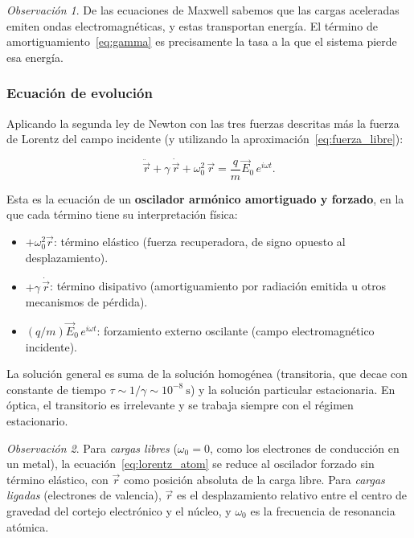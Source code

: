 \documentclass[12pt, a4paper]{article}
\theoremstyle{plain}
\theoremstyle{definition}
\theoremstyle{remark}
\newtheorem*{observacion}{Observación}
\newcommand{\ve}[1]{\vec{#1}}
\begin{document}
\begin{observacion}
De las ecuaciones de Maxwell sabemos que las cargas aceleradas emiten
ondas electromagnéticas, y estas transportan energía. El término de
amortiguamiento~\eqref{eq:gamma} es precisamente la tasa a la que el
sistema pierde esa energía.
\end{observacion}

\subsubsection{Ecuación de evolución}

Aplicando la segunda ley de Newton con las tres fuerzas descritas más la
fuerza de Lorentz del campo incidente (y utilizando la
aproximación~\eqref{eq:fuerza_libre}):

\begin{mdframed}[style=resultado]
\begin{equation}
  \ddot{\ve{r}} + \gamma\,\dot{\ve{r}} + \omega_0^2\,\ve{r}
  = \frac{q}{m}\ve{E}_0\,e^{i\omega t}.
  \label{eq:lorentz_atom}
\end{equation}
\end{mdframed}

Esta es la ecuación de un \textbf{oscilador armónico amortiguado y forzado},
en la que cada término tiene su interpretación física:
\begin{itemize}
  \item $+\omega_0^2\ve{r}$: término elástico (fuerza recuperadora, de signo
        opuesto al desplazamiento).
  \item $+\gamma\,\dot{\ve{r}}$: término disipativo (amortiguamiento por
        radiación emitida u otros mecanismos de pérdida).
  \item $(q/m)\ve{E}_0\,e^{i\omega t}$: forzamiento externo oscilante (campo
        electromagnético incidente).
\end{itemize}
La solución general es suma de la solución homogénea (transitoria, que decae
con constante de tiempo $\tau \sim 1/\gamma \sim 10^{-8}\ \mathrm{s}$) y la
solución particular estacionaria. En óptica, el transitorio es irrelevante y
se trabaja siempre con el régimen estacionario.

\begin{observacion}
Para \emph{cargas libres} ($\omega_0=0$, como los electrones de conducción en un metal), la ecuación~\eqref{eq:lorentz_atom} se reduce al oscilador forzado sin término elástico, con $\ve{r}$ como posición absoluta de la carga libre.
Para \emph{cargas ligadas} (electrones de valencia), $\ve{r}$ es el desplazamiento relativo entre el centro de gravedad del cortejo electrónico y el núcleo, y $\omega_0$ es la frecuencia de resonancia atómica.
\end{observacion}
\end{document}
